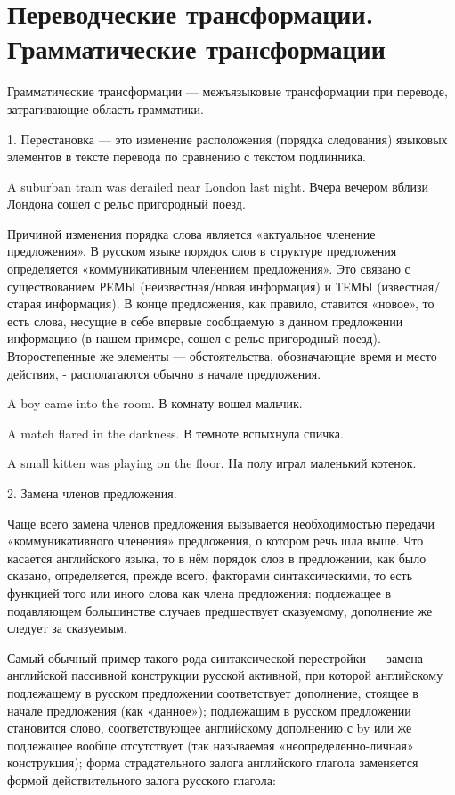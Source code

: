 \section{Переводческие трансформации. Грамматические трансформации}

Грамматические трансформации --- межъязыковые трансформации при переводе, затрагивающие область грамматики.

1. Перестановка --- это изменение расположения (порядка следования) языковых элементов в тексте перевода по сравнению с текстом подлинника.

A suburban train was derailed near London last night. Вчера вечером вблизи Лондона сошел с рельс пригородный поезд.

Причиной изменения порядка слова является «актуальное членение предложения». В русском языке порядок слов в структуре предложения определяется «коммуникативным членением предложения». Это связано с существованием РЕМЫ (неизвестная/новая информация) и ТЕМЫ (известная/старая информация). В конце предложения, как правило, ставится «новое», то есть слова, несущие в себе впервые сообщаемую в данном предложении информацию (в нашем примере, сошел с рельс пригородный поезд). Второстепенные же элементы --- обстоятельства, обозначающие время и место действия, - располагаются обычно в начале предложения.

A boy came into the room. В комнату вошел мальчик.

A match flared in the darkness. В темноте вспыхнула спичка.

A small kitten was playing on the floor. На полу играл маленький котенок.

2. Замена членов предложения.

Чаще всего замена членов предложения вызывается необходимостью передачи «коммуникативного членения» предложения, о котором речь шла выше.  Что касается английского языка, то в нём порядок слов в предложении, как было сказано, определяется, прежде всего, факторами синтаксическими, то есть функцией того или иного слова как члена предложения: подлежащее в подавляющем большинстве случаев предшествует сказуемому, дополнение же следует за сказуемым.

Самый обычный пример такого рода синтаксической перестройки --- замена английской пассивной конструкции русской активной, при которой английскому подлежащему в русском предложении соответствует дополнение, стоящее в начале предложения (как «данное»); подлежащим в русском предложении становится слово, соответствующее английскому дополнению с by или же подлежащее вообще отсутствует (так называемая «неопределенно-личная» конструкция); форма страдательного залога английского глагола заменяется формой действительного залога русского глагола:

